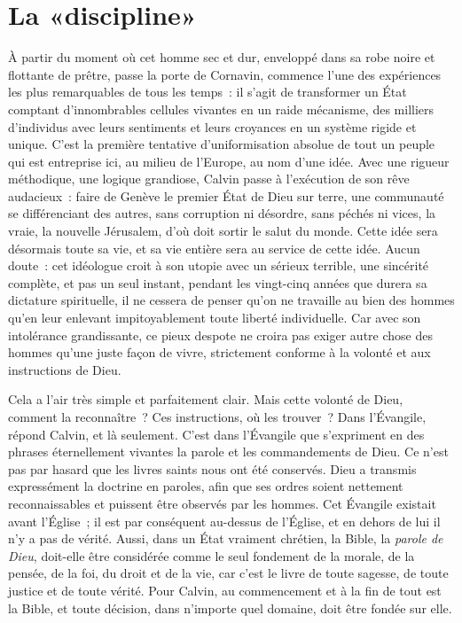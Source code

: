\documentclass[french,twoside]{book} %
\newcommand\chapteropen{} %
\newcommand\chaptercont{} %
\begin{document}
\chapteropen

\chapter[{La «discipline»}]{La «discipline»}
\renewcommand{\leftmark}{La «discipline»}


\chaptercont
\noindent À partir du moment où cet homme sec et dur, enveloppé dans sa robe noire et flottante de prêtre, passe la porte de Cornavin, commence l’une des expériences les plus remarquables de tous les temps : il s’agit de transformer un État comptant d’innombrables cellules vivantes en un raide mécanisme, des milliers d’individus avec leurs sentiments et leurs croyances en un système rigide et unique. C’est la première tentative d’uniformisation absolue de tout un peuple qui est entreprise ici, au milieu de l’Europe, au nom d’une idée. Avec une rigueur méthodique, une logique grandiose, Calvin passe à l’exécution de son rêve audacieux : faire de Genève le premier État de Dieu sur terre, une communauté se différenciant des autres, sans corruption ni désordre, sans péchés ni vices, la vraie, la nouvelle Jérusalem, d’où doit sortir le salut du monde. Cette idée sera désormais toute sa vie, et sa vie entière sera au service de cette idée. Aucun doute : cet idéologue croit à son utopie avec un sérieux terrible, une sincérité complète, et pas un seul instant, pendant les vingt-cinq années que durera sa dictature spirituelle, il ne cessera de penser qu’on ne travaille au bien des hommes qu’en leur enlevant impitoyablement toute liberté individuelle. Car avec son intolérance grandissante, ce pieux despote ne croira pas exiger autre chose des hommes qu’une juste façon de vivre, strictement conforme à la volonté et aux instructions de Dieu.\par
Cela a l’air très simple et parfaitement clair. Mais cette volonté de Dieu, comment la reconnaître ? Ces instructions, où les trouver ? Dans l’Évangile, répond Calvin, et là seulement. C’est dans l’Évangile que s’expriment en des phrases éternellement vivantes la parole et les commandements de Dieu. Ce n’est pas par hasard que les livres saints nous ont été conservés. Dieu a transmis expressément la doctrine en paroles, afin que ses ordres soient nettement reconnaissables et puissent être observés par les hommes. Cet Évangile existait avant l’Église ; il est par conséquent au-dessus de l’Église, et en dehors de lui il n’y a pas de vérité. Aussi, dans un État vraiment chrétien, la Bible, la \emph{parole de Dieu}, doit-elle être considérée comme le seul fondement de la morale, de la pensée, de la foi, du droit et de la vie, car c’est le livre de toute sagesse, de toute justice et de toute vérité. Pour Calvin, au commencement et à la fin de tout est la Bible, et toute décision, dans n’importe quel domaine, doit être fondée sur elle.\par
\end{document}
